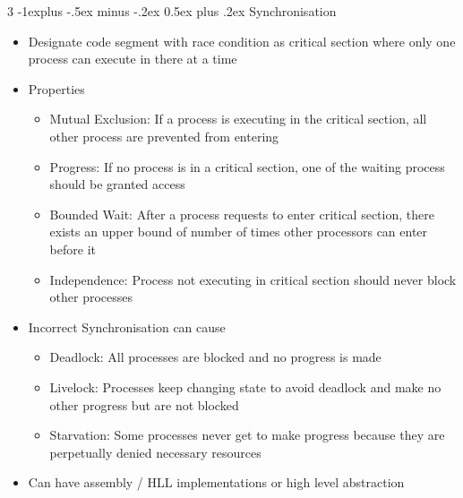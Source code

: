 \documentclass[10pt, landscape]{article}
\makeatletter
\renewcommand{\section}{\@startsection{section}{1}{0mm}%
                                {-1ex plus -.5ex minus -.2ex}%
                                {0.5ex plus .2ex}%
                                {\normalfont\large\bfseries}}
\renewcommand{\section}{\@startsection{section}{2}{0mm}%
                                {-1explus -.5ex minus -.2ex}%
                                {0.5ex plus .2ex}%
                                {\normalfont\normalsize\bfseries}}
\makeatother
\begin{document}
\begin{multicols*}{3}
\section{Synchronisation}
\begin{itemize}
    \item Designate code segment with race condition as critical section where only one process can execute in there at a time
    \item Properties
    \begin{itemize}
        \item Mutual Exclusion: If a process is executing in the critical section, all other process are prevented from entering
        \item Progress: If no process is in a critical section, one of the waiting process should be granted access
        \item Bounded Wait: After a process requests to enter critical section, there exists an upper bound of number of times other processors can enter before it
        \item Independence: Process not executing in critical section should never block other processes
    \end{itemize}
    \item Incorrect Synchronisation can cause
    \begin{itemize}
        \item Deadlock: All processes are blocked and no progress is made
        \item Livelock: Processes keep changing state to avoid deadlock and make no other progress but are not blocked
        \item Starvation: Some processes never get to make progress because they are perpetually denied necessary resources
    \end{itemize}
    \item Can have assembly / HLL implementations or high level abstraction

\end{itemize}
\end{multicols*}
\end{document}
